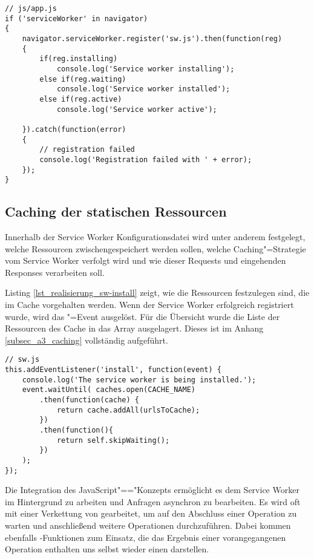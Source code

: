\begin{lstlisting}[caption={Einrichtung Service Worker},label={lst_realisierung_register-service-worker}, frame=single]
// js/app.js
if ('serviceWorker' in navigator)
{
    navigator.serviceWorker.register('sw.js').then(function(reg) 
    {
        if(reg.installing)
            console.log('Service worker installing');
        else if(reg.waiting)
            console.log('Service worker installed');
        else if(reg.active)
            console.log('Service worker active');

    }).catch(function(error)
    {
        // registration failed
        console.log('Registration failed with ' + error);
    });
}
\end{lstlisting}

\subsection{Caching der statischen Ressourcen}

Innerhalb der Service Worker Konfigurationsdatei wird unter anderem festgelegt, welche Ressourcen zwischengespeichert werden sollen, welche Caching"=Strategie vom Service Worker verfolgt wird und wie dieser Requests und eingehenden Responses verarbeiten soll. 

Listing \ref{lst_realisierung_sw-install} zeigt, wie die Ressourcen festzulegen sind, die im Cache vorgehalten werden. Wenn der Service Worker erfolgreich registriert wurde, wird das "=Event ausgelöst. Für die Übersicht wurde die Liste der Ressourcen des Cache in das Array  ausgelagert. Dieses ist im Anhang \ref{subsec_a3_caching} vollständig aufgeführt.\\

\begin{lstlisting}[caption={Ressourcen festlegen, die im Zwischenspeicher vorgehalten werden sollen},label={lst_realisierung_sw-install}, frame=single]
// sw.js
this.addEventListener('install', function(event) {
    console.log('The service worker is being installed.');
    event.waitUntil( caches.open(CACHE_NAME)
        .then(function(cache) {
            return cache.addAll(urlsToCache);
        })
        .then(function(){
            return self.skipWaiting();
        })
    );
});
\end{lstlisting}
  
Die Integration des JavaScript"=="Konzepts ermöglicht es dem Service Worker im Hintergrund zu arbeiten und Anfragen asynchron zu bearbeiten. Es wird oft mit einer Verkettung von  gearbeitet, um auf den Abschluss einer Operation zu warten und anschließend weitere Operationen durchzuführen. Dabei kommen ebenfalls -Funktionen zum Einsatz, die das Ergebnis einer vorangegangenen Operation enthalten uns selbst wieder einen  darstellen.  

